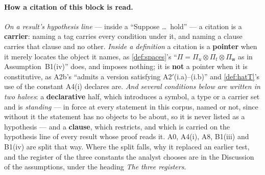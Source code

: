 \paragraph{How a citation of this block is read.}
\emph{On a result's hypothesis line} --- inside a ``Suppose \dots\ hold'' --- a citation is a
\textbf{carrier}: naming a tag carries every condition under it, and naming a clause carries that clause
and no other. \emph{Inside a definition} a citation is a \textbf{pointer} when it merely locates the
object it names, as \cref{def:spaces}'s ``$\Pi=\Pi_u\otimes\Pi_t\otimes\Pi_{\mathsf w}$ as in
Assumption~B1(iv)'' does, and imposes nothing; it is \textbf{not} a pointer when it is constitutive, as
A2b's ``admits a version satisfying A2$'$(i.a)--(i.b)'' and \cref{def:hatT}'s use of the constant A4(i)
declares are. \emph{And several conditions below are written in two halves}: a \textbf{declarative}
half, which introduces a symbol, a type or a carrier set and is \emph{standing} --- in force at every
statement in this corpus, named or not, since without it the statement has no objects to be about, so
it is never listed as a hypothesis --- and a \textbf{clause}, which restricts, and which is carried on
the hypothesis line of every result whose proof reads it. A0, A4(i), A8, B1(iii) and B1(iv) are split
that way. Where the split falls, why it replaced an earlier test, and the register of the three
constants the analyst chooses are in the Discussion of the assumptions, under the heading \emph{The
three registers}.

